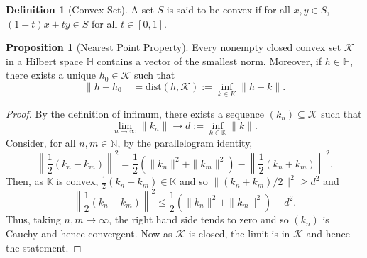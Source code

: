 \documentclass[]{article}
\theoremstyle{definition}
\theoremstyle{definition}
\newtheorem{definition}{Definition}[section]
\newtheorem{proposition}{Proposition}[section]
\begin{document}
\begin{definition}[Convex Set]
  A set \(S\) is said to be convex if for all \(x, y \in S\), 
  \((1 - t)x + ty \in S\) for all \(t \in [0, 1]\).
\end{definition}

\begin{proposition}[Nearest Point Property]
  Every nonempty closed convex set \(\mathcal{K}\) in a Hilbert space 
  \(\mathbb{H}\) contains a vector of the smallest norm. Moreover, if 
  \(h \in \mathbb{H}\), there exists a unique \(h_0 \in \mathcal{K}\) 
  such that 
  \[\|h - h_0\| = \text{dist}(h, \mathcal{K}) := \inf_{k \in K} \|h - k\|.\]
\end{proposition}
\begin{proof}
  By the definition of infimum, there exists a sequence 
  \((k_n) \subseteq \mathcal{K}\) such that 
  \[\lim_{n \to \infty} \|k_n\| \to d := \inf_{k \in \mathbb{K}} \|k\|.\]
  Consider, for all \(n, m \in \mathbb{N}\), by the parallelogram identity,
  \[\left\|\frac{1}{2}(k_n - k_m)\right\|^2 = 
    \frac{1}{2}(\|k_n\|^2 + \|k_m\|^2) - \left\|\frac{1}{2}(k_n + k_m)\right\|^2.\]
  Then, as \(\mathbb{K}\) is convex, \(\frac{1}{2}(k_n + k_m) \in \mathbb{K}\) 
  and so \(\|(k_n + k_m) / 2\|^2 \ge d^2\) and 
  \[\left\|\frac{1}{2}(k_n - k_m)\right\|^2 \le 
    \frac{1}{2}(\|k_n\|^2 + \|k_m\|^2) - d^2.\]
  Thus, taking \(n, m \to \infty\), the right hand side tends to zero and so 
  \((k_n)\) is Cauchy and hence convergent. Now as \(\mathcal{K}\) is closed, 
  the limit is in \(\mathcal{K}\) and hence the statement.
\end{proof}
\end{document}
